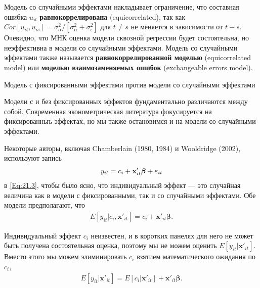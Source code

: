 Модель со случайными эффектами накладывает ограничение, что составная ошибка $u_{it}$ \textbf{равнокоррелирована} (equicorrelated), так как $Cor[u_{it},u_{is}]=\sigma^2_{\alpha}/[\sigma^2_{\alpha} + \sigma^2_{\epsilon}]$ для $t\neq s$ не меняется в зависимости от $t-s$. Очевидно, что МНК оценка модели сквозной регрессии будет состоятельна, но неэффективна в модели со случайными эффектами. Модель со случайными эффектами также называется \textbf{равнокоррелированной моделью} (equicorrelated model) или \textbf{моделью взаимозаменяемых ошибок} (exchangeable errors model).

{\centering
Модель с фиксированными эффектами против модели со случайными эффектами\\}

Модели с и без фиксированных эффектов фундаментально различаются между собой. Современная эконометрическая литература фокусируется на фиксированныъ эффектах, но мы также остановимся и на модели со случайными эффектами.

Некоторые авторы, включая Chamberlain (1980, 1984) и  Wooldridge (2002), используют запись
\begin{align}
y_{it} = c_i + \mathbf x'_{it} \bm{\beta} + \varepsilon_{it}
\nonumber
\end{align}
в \ref{Eq:21.3}, чтобы было ясно, что индивидуальный эффект --- это случайная величина как в модели с фиксированными, так и со случайными эффектами. Обе модели предполагают, что
\begin{align}
E[y_{it} | c_i,  \mathbf x'_{it}] = c_i +  \mathbf x'_{it} \bm{\beta}.
\nonumber
\end{align}

Индивидуальный эффект $c_i$ неизвестен, и  в коротких панелях для него не может быть получена состоятельная оценка, поэтому мы не можем оценить $E[y_{it} | \mathbf x'_{it}]$. Вместо этого мы можем элиминировать $c_i$ взятием математического ожидания по $c_i$, 
\begin{align}
E[y_{it} | \mathbf x'_{it}] = E [c_i | \mathbf x'_{it}] + \mathbf x'_{it} \bm{\beta}\nonumber.
\end{align}

